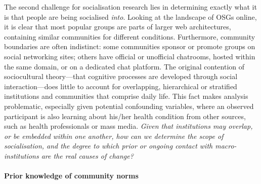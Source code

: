 The second challenge for socialisation research lies in determining exactly what it is that people are being socialised \emph{into}. Looking at the landscape of \glspl{OSG} online, it is clear that most popular groups are parts of larger web architectures, containing similar communities for different conditions. Furthermore, community boundaries are often indistinct: some communities sponsor or promote groups on social networking sites; others have official or unofficial chatrooms, hosted within the same domain, or on a dedicated chat platform. The original contention of sociocultural theory---that cognitive processes are developed through social interaction---does little to account for overlapping, hierarchical or stratified institutions and communities that comprise daily life. This fact makes analysis problematic, especially given potential confounding variables, where an observed participant is also learning about his\slash her health condition from other sources, such as health professionals or mass media. \emph{Given that institutions may overlap, or be embedded within one another, how can we determine the scope of socialisation, and the degree to which prior or ongoing contact with macro-institutions are the real causes of change?}


\paragraph{Prior knowledge of community norms}


